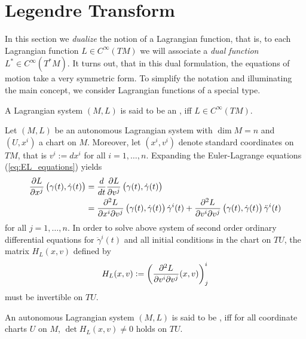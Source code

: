 \section*{Legendre Transform}
In this section we \emph{dualize} the notion of a Lagrangian function, that is, to each Lagrangian function $L \in C^\infty(TM)$ we will associate a \emph{dual function} $L^* \in C^\infty(T^*M)$. It turns out, that in this dual formulation, the equations of motion take a very symmetric form. To simplify the notation and illuminating the main concept, we consider Lagrangian functions of a special type.

\begin{definition}
	A Lagrangian system $(M,L)$ is said to be an , iff $L \in C^\infty(TM)$.
\end{definition}

Let $(M,L)$ be an autonomous Lagrangian system with $\dim M = n$ and $(U,x^i)$ a chart on $M$. Moreover, let $(x^i,v^i)$ denote standard coordinates on $TM$, that is $v^i := dx^i$ for all $i = 1,\dots,n$. Expanding the Euler-Lagrange equations (\ref{eq:EL_equations}) yields
\begin{align*}
	\frac{\partial L}{\partial x^j}\del[1]{\gamma(t),\dot{\gamma}(t)} &= \frac{d}{dt}\frac{\partial L}{\partial v^j}\del[1]{\gamma(t),\dot{\gamma}(t)}\\
	&= \frac{\partial^2 L}{\partial x^i\partial v^j}\del[1]{\gamma(t),\dot{\gamma}(t)}\dot{\gamma}^i(t) + \frac{\partial^2 L}{\partial v^i\partial v^j}\del[1]{\gamma(t),\dot{\gamma}(t)}\ddot{\gamma}^i(t)
\end{align*}
\noindent for all $j = 1,\dots,n$. In order to solve above system of second order ordinary differential equations for $\ddot{\gamma}^i(t)$ and all initial conditions in the chart on $TU$, the matrix $H_L(x,v)$ defined by
\begin{equation}
	\label{eq:H_L}
	H_L(x,v) := \del[3]{\frac{\partial^2 L}{\partial v^i\partial v^j}(x,v)}_j^i
\end{equation}
\noindent must be invertible on $TU$.

\begin{definition}
	An autonomous Lagrangian system $(M,L)$ is said to be , iff for all coordinate charts $U$ on $M$, $\det H_L(x,v) \neq 0$ holds on $TU$. 
\end{definition}


